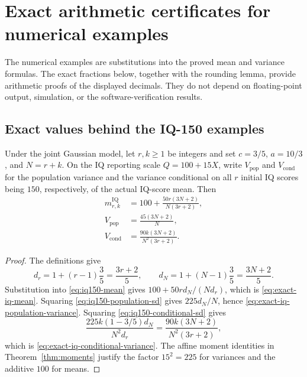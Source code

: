 \chapter{Exact arithmetic certificates for numerical examples}
\label{sec:certificates}

The numerical examples are substitutions into the proved mean and variance
formulas. The exact fractions below, together with the rounding lemma,
provide arithmetic proofs of the displayed decimals. They do not depend on
floating-point output, simulation, or the software-verification results.

\section{Exact values behind the IQ-150 examples}

\begin{corollary}
\label{cor:exact-iq-values}
Under the joint Gaussian model, let \(r,k\geq1\) be integers and set
\(c=3/5\), \(a=10/3\), and \(N=r+k\). On the IQ reporting scale
\(Q=100+15X\), write \(V_{\mathrm{pop}}\) and \(V_{\mathrm{cond}}\) for the
population variance and the variance conditional on all \(r\) initial
IQ scores being \(150\), respectively, of the actual IQ-score mean. Then
\begin{align}
 m_{r,k}^{\mathrm{IQ}}
   &=100+\frac{50r(3N+2)}{N(3r+2)},
      \label{eq:exact-iq-mean}\\
 V_{\mathrm{pop}}
   &=\frac{45(3N+2)}{N},
      \label{eq:exact-iq-population-variance}\\
 V_{\mathrm{cond}}
   &=\frac{90k(3N+2)}{N^2(3r+2)}.
      \label{eq:exact-iq-conditional-variance}
\end{align}
\end{corollary}

\begin{proof}
The definitions give
\[
 d_r=1+(r-1)\frac35=\frac{3r+2}{5},\qquad
 d_N=1+(N-1)\frac35=\frac{3N+2}{5}.
\]
Substitution into \eqref{eq:iq150-mean} gives
\(100+50r d_N/(N d_r)\), which is
\eqref{eq:exact-iq-mean}. Squaring
\eqref{eq:iq150-population-sd} gives \(225d_N/N\), hence
\eqref{eq:exact-iq-population-variance}. Squaring
\eqref{eq:iq150-conditional-sd} gives
\[
 \frac{225k(1-3/5)d_N}{N^2d_r}
   =\frac{90k(3N+2)}{N^2(3r+2)},
\]
which is \eqref{eq:exact-iq-conditional-variance}. The affine moment
identities in Theorem~\ref{thm:moments} justify the factor \(15^2=225\)
for variances and the additive \(100\) for means.
\end{proof}

